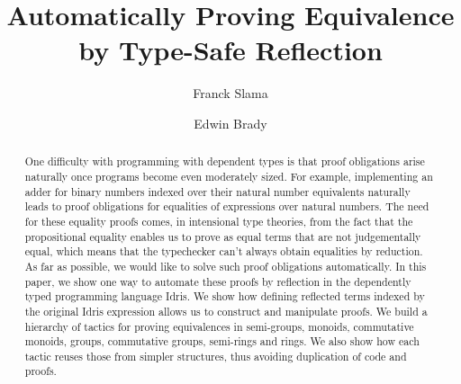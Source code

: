 \documentclass{llncs}
\begin{document}
%
\pagestyle{headings}  %

\mainmatter              %
%
\title{Automatically Proving Equivalence by Type-Safe Reflection}
%
%
\author{Franck Slama \and Edwin Brady}

\maketitle              %

\begin{abstract}
One difficulty with programming with dependent types is that proof obligations
arise naturally once programs become even moderately sized. For example,
implementing an adder for binary numbers indexed over their natural number
equivalents naturally leads to proof obligations for equalities of expressions
over natural numbers. The need for these equality proofs comes, in intensional
type theories, from the fact that the propositional equality enables us to
prove as equal terms that are not judgementally equal, which means that the
typechecker can't always obtain equalities by reduction.  As far as possible,
we would like to solve such proof obligations automatically. In this paper, we
show one way to automate these proofs by reflection in the dependently typed
programming language Idris.  We show how defining reflected terms indexed by
the original Idris expression allows us to construct and manipulate proofs. We
build a hierarchy of tactics for proving equivalences in semi-groups, monoids,
commutative monoids, groups, commutative groups, semi-rings and rings. We also
show how each tactic reuses those from simpler structures, thus avoiding
duplication of code and proofs.


\end{abstract}
%












\end{document}
